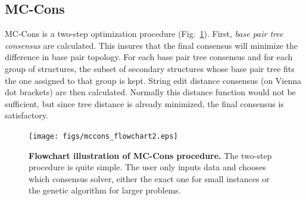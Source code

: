 \documentclass[10pt,letterpaper]{article}
\begin{document}
\subsection*{MC-Cons}

MC-Cons is a two-step optimization procedure (Fig.~\ref{fig1}). First, \textit{base pair tree consensus} are calculated. This insures that the final consensus will minimize the difference in base pair topology.
For each base pair tree consensus and for each group of structures, the subset of secondary structures whose base pair tree fits the one assigned to that group is kept. String edit distance consensus (on Vienna dot brackets) are then calculated. Normally this distance function would not be sufficient, but since tree distance is already minimized, the final consensus is satisfactory.\newline



\begin{figure}[h]
\begin{center}
\texttt{[image: figs/mccons\_flowchart2.eps]}
\caption{{\bf Flowchart illustration of MC-Cons procedure.}
The two-step procedure is quite simple. The user only inputs data and chooses which consensus solver, either the exact one for small instances or the genetic algorithm for larger problems.}
\label{fig1}
\end{center}
\end{figure}





\newpage




\end{document}

